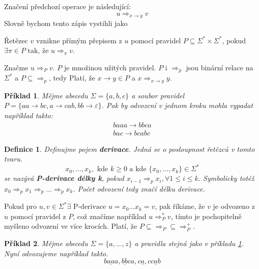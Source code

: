 \documentclass[10pt, a4paper, titlepage]{article}
\theoremstyle{note}
\newtheorem{definice}{\textbf{Definice}}
\newtheorem{priklad}{\textbf{Příklad}}
\begin{document}
Značení předchozí operace je následující:
$$
u \Rightarrow_{x \rightarrow y} v
$$
Slovně bychom tento zápis vystihli jako 

Řetězec $v$ vznikne přímým přepisem z $u$ pomocí pravidel $P \subseteq  \Sigma^{*} \times \Sigma^{*}$, pokud
$\exists \pi \in P \text{ tak, že } u \Rightarrow_{\pi} v$.

Značme $u \Rightarrow_{P} v$. $P$ je množinou užitých pravidel. $P$ i $\Rightarrow_{p}$ jsou binární relace na $\Sigma^{*}$ a
$P \subseteq  \Rightarrow_{p}$, tedy  Platí, že $x \rightarrow y \in P$ a $x \Rightarrow_{x \rightarrow y} y$.

\begin{priklad}
Mějme abecedu $\Sigma = \lbrace a, b, c \rbrace$ a soubor pravidel $P = \lbrace aa \rightarrow bc, a \rightarrow cab, bb \rightarrow \varepsilon \rbrace$\label{priklad-1}.
Pak by odvození v jednom kroku mohla vypadat například takto:
\begin{gather*}
baaa \rightarrow bbca \\
bac \rightarrow bcabc
\end{gather*}
\end{priklad}

\begin{definice}
Definujme pojem \textbf{derivace}. Jedná se o posloupnost řetězců v tomto tvaru.
$$
x_{0}, \ldots, x_{k},\text{ kde } k \geq 0\text{ a kde } \lbrace x_{0}, \ldots, x_{k} \rbrace \in \Sigma^{*}
$$
se nazývá \textbf{P-derivace délky k}, pokud $x_{i-1} \Rightarrow_{p} x_{i}, \forall 1 \leq i \leq k $.
Symbolicky totéž $x_{0} \Rightarrow_{p} x_{1} \Rightarrow_{p} \ldots \Rightarrow_{p} x_{k}$. Počet odvození tedy značí \emph{délku} derivace.
\end{definice}

Pokud pro $u, v \in \Sigma^{*} \exists \text{ P-derivace } u = x_{0} \ldots x_{k} = v$, pak říkáme, že $v$ je odvozeno z $u$ pomocí pravidel z $P$, což značíme
například $u \Rightarrow_{P}^{*} v$, tímto je pochopitelně myšleno odvození ve více krocích. Platí, že $P \subseteq \Rightarrow_{P} \subseteq \Rightarrow_{P}^{+}$.

\begin{priklad}
Mějme abecedu $\Sigma = \lbrace a, \ldots, z \rbrace$ a pravidla stejná jako v příkladu \ref{priklad-1}.
Nyní odvozujeme například takto.
$$
b\underline{aa}a, \underline{bb}ca, c\underline{a}, c\underline{cab}
$$
\end{priklad}
\end{document}
